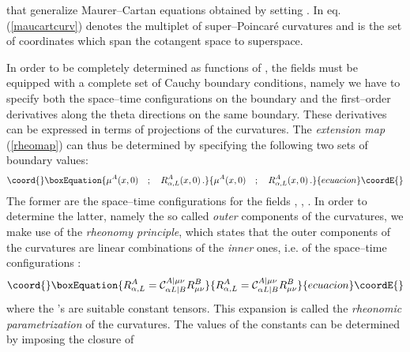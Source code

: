 \documentclass[a4paper,12pt]{article}
\begin{document}
that generalize Maurer--Cartan equations obtained by setting \coordHE{}.
In eq. (\ref{maucartcurv})
\coordHE{} denotes the multiplet \coordHE{} of super--Poincar\'e curvatures
and \coordHE{} is the set of coordinates which
span the cotangent space to superspace.
\par
In order to be completely determined as functions of
\coordHE{}, the fields \coordHE{}  must be equipped
with a complete set of Cauchy boundary conditions, namely we have to specify both
the space--time configurations \coordHE{} on the boundary \coordHE{}
and  the first--order derivatives along the theta
directions \coordHE{}
on the same boundary.
These derivatives can be expressed in terms of  \myHighlight{$\theta$}\coordHE{} projections
\coordHE{} of the \coordHE{} curvatures.
The {\it extension map} (\ref{rheomap}) can thus be determined by
specifying the following two sets of boundary
values:
\begin{equation}\coord{}\boxEquation{
\mu^A(x,0) \quad ; \quad R^A_{\alpha,L}(x,0)\,.
}{
\mu^A(x,0) \quad ; \quad R^A_{\alpha,L}(x,0)\,.
}{ecuacion}\coordE{}\end{equation}
The former are the space--time configurations for the fields
\coordHE{}, \coordHE{}, \coordHE{}. In order to determine the latter,
namely the so called {\sl outer} components of
the curvatures,
we make use of the {\sl rheonomy principle}, which states that the
outer
components of the curvatures are linear combinations of the {\sl inner} ones, i.e. of the
space--time configurations \coordHE{}:
\begin{equation}\coord{}\boxEquation{
\label{rheoconstraints}
R^A_{\alpha,L} = \mathcal{C}^{A|\mu\nu}_{\alpha L|B}R^B_{\mu\nu}
}{
R^A_{\alpha,L} = \mathcal{C}^{A|\mu\nu}_{\alpha L|B}R^B_{\mu\nu}
}{ecuacion}\coordE{}\end{equation}
where the \coordHE{}'s are suitable constant tensors.
This expansion is called the {\sl  rheonomic parametrization}
of the curvatures.
The values of the constants \coordHE{} can be determined by imposing the closure of
\end{document}
